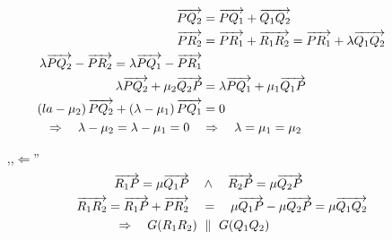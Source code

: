 \begin{mysatz}
\begin{minipage}{0.4\textwidth}
\begin{center}
        \end{center}
    \end{minipage}
    \begin{align*}
        \overrightarrow{PQ_2} & = \overrightarrow{PQ_1} + \overrightarrow{Q_1 Q_2}\\
        \overrightarrow{PR_2} & = \overrightarrow{PR_1} + \overrightarrow{R_1 R_2} = \overrightarrow{PR_1} + \lambda \overrightarrow{Q_1 Q_2}\\
        \lambda \overrightarrow{PQ_2} - \overrightarrow{PR_2} = \lambda \overrightarrow{PQ_1} - \overrightarrow{PR_1}\\
        \lambda \overrightarrow{PQ_2} + \mu_2 \overrightarrow{Q_2 P} & = \lambda \overrightarrow{PQ_1} + \mu_1 \overrightarrow{Q_1 P}\\
        \left( la - \mu_2 \right) \overrightarrow{PQ_2} + \left( \lambda - \mu_1 \right) \overrightarrow{PQ_1} & = 0\\
        \Rightarrow \quad \lambda - \mu_2 = \lambda - \mu_1 = 0 \quad & \Rightarrow \quad \lambda = \mu_1 = \mu_2\\
    \end{align*}
    \begin{itemize}
        \item[,,$\Leftarrow$'']
            \begin{align*}
                \overrightarrow{R_1 P} = \mu \overrightarrow{Q_1 P} \quad & \wedge \quad \overrightarrow{R_2 P} = \mu \overrightarrow{Q_2 P}\\
                \overrightarrow{R_1 R_2} = \overrightarrow{R_1 P} + \overrightarrow{PR_2} \quad & = \quad \mu \overrightarrow{Q_1 P} - \mu \overrightarrow{Q_2 P} = \mu \overrightarrow{Q_1 Q_2}\\
                \Rightarrow \quad G(R_1 R_2) \ & \parallel \ G(Q_1 Q_2)
            \end{align*}
    \end{itemize}
\end{mysatz}


